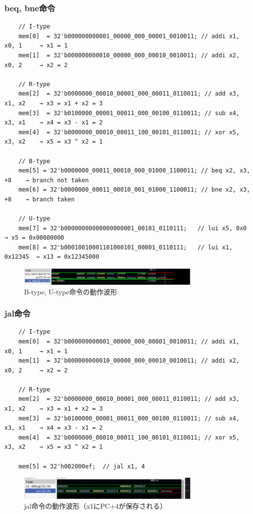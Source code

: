 \documentclass[a4paper, 11pt]{article}
\begin{document}
\subsubsection{beq, bne命令}
\begin{lstlisting}
    // I-type
    mem[0]  = 32'b000000000001_00000_000_00001_0010011; // addi x1, x0, 1     → x1 = 1
    mem[1]  = 32'b000000000010_00000_000_00010_0010011; // addi x2, x0, 2     → x2 = 2

    // R-type
    mem[2]  = 32'b0000000_00010_00001_000_00011_0110011; // add x3, x1, x2    → x3 = x1 + x2 = 3
    mem[3]  = 32'b0100000_00001_00011_000_00100_0110011; // sub x4, x3, x1    → x4 = x3 - x1 = 2
    mem[4]  = 32'b0000000_00010_00011_100_00101_0110011; // xor x5, x3, x2    → x5 = x3 ^ x2 = 1

    // B-type
    mem[5] = 32'b0000000_00011_00010_000_01000_1100011; // beq x2, x3, +8    → branch not taken
    mem[6] = 32'b0000000_00011_00010_001_01000_1100011; // bne x2, x3, +8    → branch taken

    // U-type
    mem[7] = 32'b00000000000000000001_00101_0110111;   // lui x5, 0x0       → x5 = 0x00000000
    mem[8] = 32'b00010010001101000101_00001_0110111;   // lui x1, 0x12345  → x13 = 0x12345000
\end{lstlisting}
\begin{figure}[h]
\centering
\includegraphics[width=0.8\textwidth]{images/b_u_type.png}
\caption{B-type, U-type命令の動作波形}
\label{fig:addwave}
\end{figure}


\subsubsection{jal命令}
\begin{lstlisting}
    // I-type
    mem[0]  = 32'b000000000001_00000_000_00001_0010011; // addi x1, x0, 1     → x1 = 1
    mem[1]  = 32'b000000000010_00000_000_00010_0010011; // addi x2, x0, 2     → x2 = 2

    // R-type
    mem[2]  = 32'b0000000_00010_00001_000_00011_0110011; // add x3, x1, x2    → x3 = x1 + x2 = 3
    mem[3]  = 32'b0100000_00001_00011_000_00100_0110011; // sub x4, x3, x1    → x4 = x3 - x1 = 2
    mem[4]  = 32'b0000000_00010_00011_100_00101_0110011; // xor x5, x3, x2    → x5 = x3 ^ x2 = 1

    mem[5] = 32'h002000ef;  // jal x1, 4
\end{lstlisting}
\begin{figure}[h]
\centering
\includegraphics[width=0.8\textwidth]{images/jal.png}
\caption{jal命令の動作波形（x1にPC+4が保存される）}
\label{fig:jalwave}
\end{figure}
\end{document}
